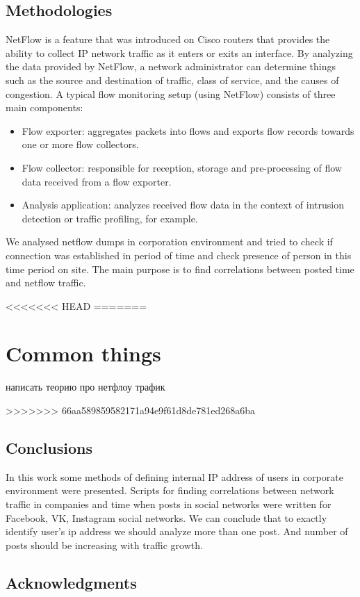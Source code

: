 \documentclass[12pt,a4paper]{report}
\begin{document}
\section{Methodologies}
NetFlow is a feature that was introduced on Cisco routers that provides the ability to collect IP network traffic as it enters or exits an interface. By analyzing the data provided by NetFlow, a network administrator can determine things such as the source and destination of traffic, class of service, and the causes of congestion. A typical flow monitoring setup (using NetFlow) consists of three main components:\cite{methodologies1}
\begin{itemize}
	\item{Flow exporter: aggregates packets into flows and exports flow records towards one or more flow collectors.}
	\item{Flow collector: responsible for reception, storage and pre-processing of flow data received from a flow exporter.}
	\item{Analysis application: analyzes received flow data in the context of intrusion detection or traffic profiling, for example.}
\end{itemize}

We analysed netflow dumps in corporation environment and tried to check if connection was established in period of time and check presence of person in this time period on site. The main purpose is to find correlations between posted time and netflow traffic.


<<<<<<< HEAD
=======
\chapter{Common things}
написать теорию про нетфлоу трафик

>>>>>>> 66aa589859582171a94e9f61d8de781ed268a6ba




\section{Conclusions}
In this work some methods of defining internal IP address of users in corporate environment were presented. Scripts for finding correlations between network traffic in companies and time when posts in social networks were written for Facebook, VK, Instagram social networks. We can conclude that to exactly identify user's ip address we should analyze more than one post. And number of posts should be increasing with traffic growth.
\section{Acknowledgments}

\end{document}
